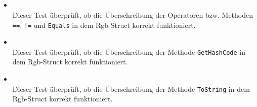 \subsection{}

\paragraph{}

\begin{itemize}

\item{}~\\
Dieser Test überprüft, ob die Überschreibung der Operatoren bzw. Methoden \verb#==#, \verb#!=# und \verb#Equals# in dem Rgb-Struct korrekt funktioniert.

\item{}~\\
Dieser Test überprüft, ob die Überschreibung der Methode \verb#GetHashCode# in dem Rgb-Struct korrekt funktioniert.

\item{}~\\
Dieser Test überprüft, ob die Überschreibung der Methode \verb#ToString# in dem Rgb-Struct korrekt funktioniert.
\end{itemize}

\subsection{}

